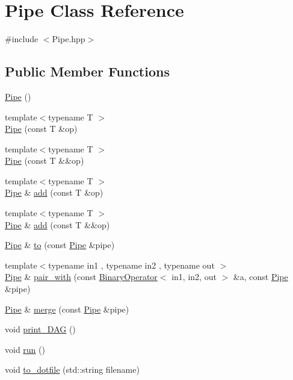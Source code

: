 \hypertarget{class_pipe}{\section{\-Pipe \-Class \-Reference}
\label{class_pipe}
}


{\ttfamily \#include $<$\-Pipe.\-hpp$>$}

\subsection*{\-Public \-Member \-Functions}
\begin{DoxyCompactItemize}
\item 
\hyperlink{class_pipe_a91ddad07e89d5585b1cf27fa7860e201}{\-Pipe} ()
\item 
{\footnotesize template$<$typename T $>$ }\\\hyperlink{class_pipe_a2112ea3ec975e32d471195d7d37dced9}{\-Pipe} (const \-T \&op)
\item 
{\footnotesize template$<$typename T $>$ }\\\hyperlink{class_pipe_ad634a48b656601f80db6fa413c47b035}{\-Pipe} (const \-T \&\&op)
\item 
{\footnotesize template$<$typename T $>$ }\\\hyperlink{class_pipe}{\-Pipe} \& \hyperlink{class_pipe_aa0577b9eaa033a89b6a76353764eed39}{add} (const \-T \&op)
\item 
{\footnotesize template$<$typename T $>$ }\\\hyperlink{class_pipe}{\-Pipe} \& \hyperlink{class_pipe_af0843b7b6b6c33606fce7a995450678a}{add} (const \-T \&\&op)
\item 
\hyperlink{class_pipe}{\-Pipe} \& \hyperlink{class_pipe_a1772082ed12c8b1df452a40439738138}{to} (const \hyperlink{class_pipe}{\-Pipe} \&pipe)
\item 
{\footnotesize template$<$typename in1 , typename in2 , typename out $>$ }\\\hyperlink{class_pipe}{\-Pipe} \& \hyperlink{class_pipe_a5ddf06055414d4ad0b511596dbf3a390}{pair\-\_\-with} (const \hyperlink{class_binary_operator}{\-Binary\-Operator}$<$ in1, in2, out $>$ \&a, const \hyperlink{class_pipe}{\-Pipe} \&pipe)
\item 
\hyperlink{class_pipe}{\-Pipe} \& \hyperlink{class_pipe_ac07aed5f6efda8248a8d3fe7410df6f2}{merge} (const \hyperlink{class_pipe}{\-Pipe} \&pipe)
\item 
void \hyperlink{class_pipe_a288d5b72778f836c7fbca280bf858976}{print\-\_\-\-D\-A\-G} ()
\item 
void \hyperlink{class_pipe_a6ecb3df1580730102c3e925875962bfd}{run} ()
\item 
void \hyperlink{class_pipe_a305c4d6db780c5e2d46a89f756d9aadf}{to\-\_\-dotfile} (std\-::string filename)
\end{DoxyCompactItemize}


